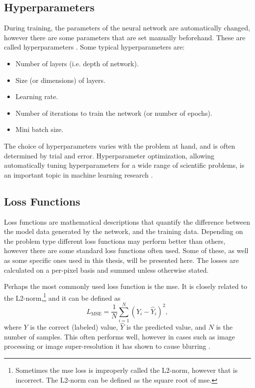 \subsection{Hyperparameters}
During training, the parameters of the neural network are automatically changed, however there are some parameters that are set manually beforehand. These are called hyperparameters \cite{claesen2015hyperparameter}. Some typical hyperparameters are:
\begin{itemize}
    \item Number of layers (i.e. depth of network).
    \item Size (or dimensions) of layers.
    \item Learning rate.
    \item Number of iterations to train the network (or number of epochs).
    \item Mini batch size.
\end{itemize}

The choice of hyperparameters varies with the problem at hand, and is often determined by trial and error. Hyperparameter optimization, allowing automatically tuning hyperparameters for a wide range of scientific problems, is an important topic in machine learning research \cite{hyperparameteroptimizing}.

\subsection{Loss Functions}
\label{sec:ml:training:lossfunctions}
Loss functions are mathematical descriptions that quantify the difference between the model data generated by the network, and the training data. Depending on the problem type different loss functions may perform better than others, however there are some standard loss functions often used. Some of these, as well as some specific ones used in this thesis, will be presented here. The losses are calculated on a per-pixel basis and summed unless otherwise stated. 

Perhaps the most commonly used loss function is the \gls{mse}. It is closely related to the L2-norm,\footnote{Sometimes the \gls{mse} loss is improperly called the L2-norm, however that is incorrect. The L2-norm can be defined as the square root of \gls{mse}. } and it can be defined as
\begin{equation}
    \label{eq:lossmse}
    L_{\text{MSE}} = \frac{1}{N} \sum_{i=1}^N(Y_i - \hat{Y}_i)^2,
\end{equation}
where $Y$ is the correct (labeled) value,  $\hat{Y}$ is the predicted value, and $N$ is the number of samples. This often performs well, however in cases such as image processing or image super-resolution it has shown to cause blurring \cite{7797130}.

